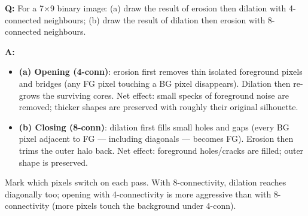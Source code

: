 \begin{exbox}
\textbf{Q:} For a 7$\times$9 binary image: (a) draw the result of erosion then dilation with 4-connected neighbours; (b) draw the result of dilation then erosion with 8-connected neighbours.

\textbf{A:}
\begin{itemize}
  \item \textbf{(a) Opening (4-conn)}: erosion first removes thin isolated foreground pixels and bridges (any FG pixel touching a BG pixel disappears). Dilation then re-grows the surviving cores. Net effect: small specks of foreground noise are removed; thicker shapes are preserved with roughly their original silhouette.
  \item \textbf{(b) Closing (8-conn)}: dilation first fills small holes and gaps (every BG pixel adjacent to FG --- including diagonals --- becomes FG). Erosion then trims the outer halo back. Net effect: foreground holes/cracks are filled; outer shape is preserved.
\end{itemize}

\begin{tipbox}
Mark which pixels switch on each pass. With 8-connectivity, dilation reaches diagonally too; opening with 4-connectivity is more aggressive than with 8-connectivity (more pixels touch the background under 4-conn).
\end{tipbox}
\end{exbox}

